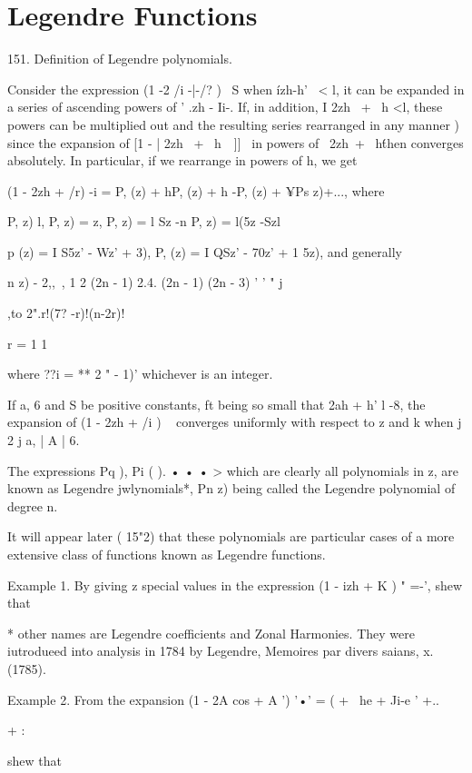 \chapter{Legendre Functions} 

151. Definition of Legendre polynomials.

Consider the expression (1 -2 /i -|-/? )~ S when \'izh-h' \ < l, it
can be expanded in a series of ascending powers of ' .zh - Ii-. If, in
addition, I 2zh \ + \ h <l, these powers can be multiplied out and the
resulting series rearranged in any manner ) since the expansion
of [1 - | 2zh \ + \ h\ \ ]]~ in powers of \ 2zh\ + \ h\' then
converges absolutely. In particular, if we rearrange in powers of h,
we get

(1 - 2zh + /r) -i = P, (z) + hP, (z) + h -P, (z) + ¥Ps z)+..., where

P, z) l, P, z) = z, P, z) = l Sz -n P, z) = l(5z -Szl

p (z) = I S5z' - Wz' + 3), P, (z) = I QSz' - 70z' + 1 5z), and
generally

 n z) - 2,, \,, 1 2 (2n - 1) 2.4. (2n - 1) (2n - 3) ' ' " j

,to 2".r!(7? -r)!(n-2r)!

r = 1 1

where ??i = ** 2 " - 1)' whichever is an integer.

If a, 6 and S be positive constants, ft being so small that 2ah + h' l
-8, the expansion of (1 - 2zh + /i ) ~ converges uniformly with
respect to z and k when j 2 j a, | A | 6.

The expressions Pq ), Pi ( ). • • • > which are clearly all
polynomials in z, are known as Legendre jwlynomials*, Pn z) being
called the Legendre polynomial of degree n.

It will appear later ( 15"2) that these polynomials are particular
cases of a more extensive class of functions known as Legendre
functions.

Example 1. By giving z special values in the expression (1 - izh + K )
" =-', shew that

* other names are Legendre coefficients and Zonal Harmonies. They were
iutrodueed into analysis in 1784 by Legendre, Memoires par divers
saians, x. (1785).

%
%

Example 2. From the expansion (1 - 2A cos + A ') '•' = ( + \ he + Ji-e
' +..\

+ :

shew that

